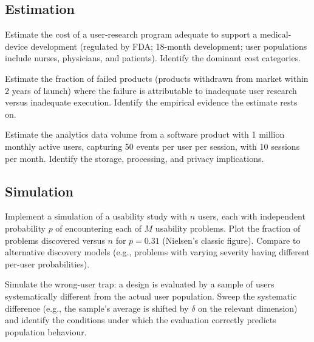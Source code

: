 \subsection*{Estimation}

\begin{exercise}
Estimate the cost of a user-research program adequate to support a medical-device development (regulated by FDA; 18-month development; user populations include nurses, physicians, and patients). Identify the dominant cost categories.
\end{exercise}

\begin{exercise}
Estimate the fraction of failed products (products withdrawn from market within 2 years of launch) where the failure is attributable to inadequate user research versus inadequate execution. Identify the empirical evidence the estimate rests on.
\end{exercise}

\begin{exercise}
Estimate the analytics data volume from a software product with 1 million monthly active users, capturing 50 events per user per session, with 10 sessions per month. Identify the storage, processing, and privacy implications.
\end{exercise}

\subsection*{Simulation}

\begin{exercise}
Implement a simulation of a usability study with $n$ users, each with independent probability $p$ of encountering each of $M$ usability problems. Plot the fraction of problems discovered versus $n$ for $p = 0.31$ (Nielsen's classic figure). Compare to alternative discovery models (e.g., problems with varying severity having different per-user probabilities).
\end{exercise}

\begin{exercise}
Simulate the wrong-user trap: a design is evaluated by a sample of users systematically different from the actual user population. Sweep the systematic difference (e.g., the sample's average is shifted by $\delta$ on the relevant dimension) and identify the conditions under which the evaluation correctly predicts population behaviour.
\end{exercise}

